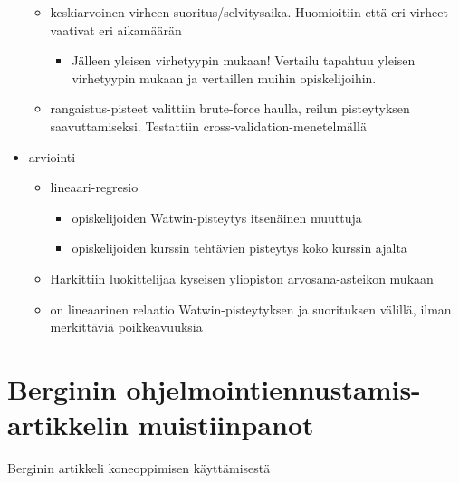 \begin{itemize}
\begin{itemize}
\begin{itemize}
        \end{itemize}
        \item keskiarvoinen virheen suoritus/selvitysaika. Huomioitiin että eri virheet vaativat eri aikamäärän
        \begin{itemize}
            \item Jälleen yleisen virhetyypin mukaan! Vertailu tapahtuu yleisen virhetyypin mukaan ja vertaillen muihin opiskelijoihin.
        \end{itemize}
        \item rangaistus-pisteet valittiin brute-force haulla, reilun pisteytyksen saavuttamiseksi. Testattiin cross-validation-menetelmällä
    \end{itemize}
    \item arviointi
    \begin{itemize}
        \item lineaari-regresio
        \begin{itemize}
            \item opiskelijoiden Watwin-pisteytys itsenäinen muuttuja
            \item opiskelijoiden kurssin tehtävien pisteytys koko kurssin ajalta
        \end{itemize} 
        \item Harkittiin luokittelijaa kyseisen yliopiston arvosana-asteikon mukaan
        \item on lineaarinen relaatio Watwin-pisteytyksen ja suorituksen välillä, ilman merkittäviä poikkeavuuksia
    \end{itemize}
\end{itemize}

\chapter{Berginin ohjelmointiennustamis-artikkelin muistiinpanot}

Berginin artikkeli koneoppimisen käyttämisestä\cite{bergin2015using}

